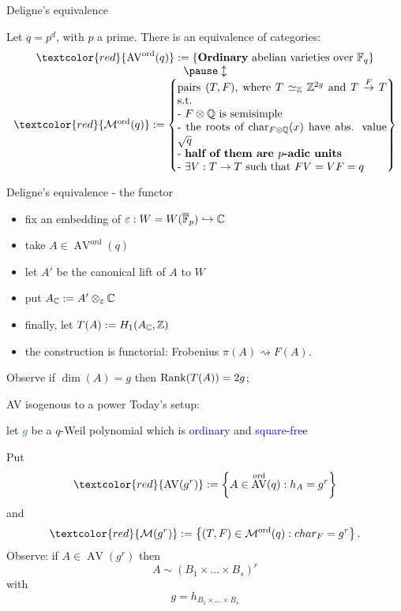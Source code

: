 \documentclass[usenames,dvipsnames,handout]{beamer}
\DeclareMathOperator{\AV}{AV}
\newcommand{\AVord}[1]{\AV^{\text{ord}}({#1})}
\newcommand{\Modord}[1]{\cM^{\text{ord}}({#1})}
\newcommand{\red}[1]{\textcolor{red}{#1}}
\newcommand{\blue}[1]{\textcolor{blue}{#1}}
\newcommand{\green}[1]{\textcolor{ForestGreen}{#1}}
\renewcommand{\char}{char}
\begin{document}
\begin{frame}{ Deligne's equivalence }
\begin{theorem}[Deligne '69]
Let $q=p^d$, with $p$ a prime. There is an equivalence of categories:
\[\begin{array}{cc}
\red{\AVord{q}}:=\set{\text{\textbf{Ordinary} abelian varieties over $\F_q$}}\\
\pause \updownarrow\\
\red{\Modord{q}}:=\set{\parbox[p]{19em}{pairs $(T,F)$, where $T\simeq_\Z \Z^{2g}$ and $T\overset{F}{\to} T$ s.t.\\
- $F\otimes \Q$ is semisimple\\
- the roots of $\Char_{F\otimes\Q}(x)$ have abs. value $\sqrt{q}$\\
- \textbf{half of them are $p$-adic units}\\
- $\exists V:T\to T$ such that $FV=VF=q$
}}
\end{array}\]
\end{theorem}
\end{frame}

\begin{frame}{ Deligne's equivalence - the functor }
 \begin{itemize}
  \item fix an embedding of $\varepsilon:W=W(\overline{\mathbb{F}}_p)\hookrightarrow \mathbb{C}$
  \item take $A\in \AVord{q}$
  \item let $A'$ be the canonical lift of $A$ to $W$
  \item put $A_{\mathbb{C}}:=A'\otimes_\varepsilon \mathbb{C}$
  \item finally, let $T(A):=H_1(A_{\mathbb{C}},\mathbb{Z})$
  \item the construction is functorial: Frobenius $\pi(A)\rightsquigarrow F(A)$.
 \end{itemize}

 \pause Observe if $\dim(A)=g$ then $\operatorname{Rank}(T(A))=2g$;
  
\end{frame}

\begin{frame}{AV isogenous to a power }
Today's setup:
\pause
\begin{center}
let \green{$g$} be a \blue{$q$}-Weil polynomial which is \blue{ordinary} and \blue{square-free} 
\end{center}
\pause Put 
\[\red{\AV(g^r)}:=\set{ A \in \AVord{q} : h_A = g^r }\]
\pause
and
\[\red{\cM(g^r)}:=\set{ (T,F) \in \Modord{q} : \char_F = g^r }.\]
\pause
Observe: if $A\in \AV(g^r)$ then
\[ A \sim (B_1\times \ldots \times B_s)^r \]
with
\[ g=h_{B_1\times \ldots \times B_s} \]
\end{frame}
\end{document}
